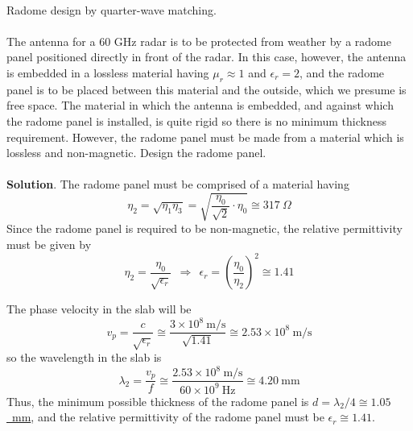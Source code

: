 ~\\ \begin{example} 
\begin{mdframed}[backgroundcolor=brown!20,linecolor=brown!20]\raggedright
Radome design by quarter-wave matching. 
\\~\\
The antenna for a 60 GHz radar is to be protected from weather by a radome panel positioned directly in front of the radar.  In this case, however, the antenna is embedded in a lossless material having $\mu_r\approx 1$ and $\epsilon_r=2$, and the radome panel is to be placed between this material and the outside, which we presume is free space.  The material in which the antenna is embedded, and against which the radome panel is installed, is quite rigid so there is no minimum thickness requirement.  However, the radome panel must be made from a material which is lossless and non-magnetic. Design the radome panel.\\
~\\

\noindent
{\bf Solution}.
The radome panel must be comprised of a material having 
%
\begin{equation}
\eta_2 = \sqrt{\eta_1\eta_3} = \sqrt{ \frac{\eta_0}{\sqrt{2}} \cdot \eta_0 } \cong 317~\Omega
\end{equation}
%
Since the radome panel is required to be non-magnetic, the relative permittivity must be given by
%
\begin{equation}
\eta_2 = \frac{\eta_0}{\sqrt{\epsilon_r}} ~~\Rightarrow~~ \epsilon_r = \left(\frac{\eta_0}{\eta_2}\right)^2 \cong 1.41
\end{equation}
%

The phase velocity in the slab will be 
%
\begin{equation}
v_p = \frac{c}{\sqrt{\epsilon_r}} \cong \frac{3 \times 10^8~\mbox{m/s}}{\sqrt{1.41}} \cong 2.53 \times 10^8~\mbox{m/s}
\end{equation}  
%
so the wavelength in the slab is 
%
\begin{equation}
\lambda_2 = \frac{v_p}{f} \cong \frac{2.53 \times 10^8~\mbox{m/s}}{60 \times 10^9~\mbox{Hz}} \cong 4.20~\mbox{mm}
\end{equation}  
%
Thus, the minimum possible thickness of the radome panel is \underline{$d=\lambda_2/4\cong 1.05$~mm}, and the relative permittivity of the radome panel must be \underline{$\epsilon_r \cong 1.41$}.

\end{mdframed}
\end{example}

